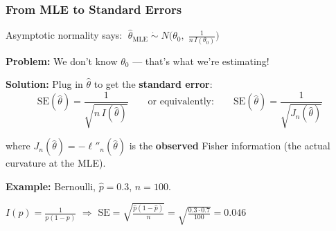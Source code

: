 \documentclass[aspectratio=169]{beamer}
\begin{document}
\begin{frame}
\frametitle{From MLE to Standard Errors}

\small
Asymptotic normality says: $\;\hat\theta_{\text{MLE}} \;\dot\sim\; N\!\Big(\theta_0,\; \frac{1}{n\,I(\theta_0)}\Big)$

\vspace{0.15cm}
\textbf{Problem:} We don't know $\theta_0$ --- that's what we're estimating!

\pause
\vspace{0.15cm}
\textbf{Solution:} Plug in $\hat\theta$ to get the \textbf{standard error}:
\vspace{-0.1cm}
$$\boxed{\text{SE}(\hat\theta) = \frac{1}{\sqrt{n\,I(\hat\theta)}}} \qquad\text{or equivalently:}\qquad \boxed{\text{SE}(\hat\theta) = \frac{1}{\sqrt{J_n(\hat\theta)}}}$$

\vspace{-0.2cm}
where $J_n(\hat\theta) = -\ell''_n(\hat\theta)$ is the \textbf{observed} Fisher information (the actual curvature at the MLE).

\pause
\vspace{0.15cm}
\textbf{Example:} Bernoulli, $\hat{p} = 0.3$, $n = 100$.

\vspace{0.05cm}
\quad $I(p) = \frac{1}{p(1{-}p)}$ \;$\Rightarrow$\; $\text{SE} = \sqrt{\frac{\hat{p}(1{-}\hat{p})}{n}} = \sqrt{\frac{0.3 \cdot 0.7}{100}} = 0.046$

\vspace{0.15cm}
\begin{center}
\end{center}
\end{frame}
\end{document}
